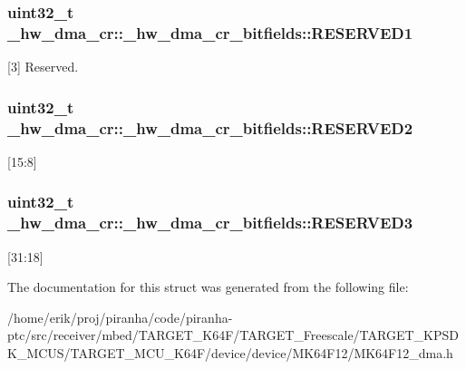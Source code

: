 \subsubsection[{\texorpdfstring{R\+E\+S\+E\+R\+V\+E\+D1}{RESERVED1}}]{\setlength{\rightskip}{0pt plus 5cm}uint32\+\_\+t \+\_\+hw\+\_\+dma\+\_\+cr\+::\+\_\+hw\+\_\+dma\+\_\+cr\+\_\+bitfields\+::\+R\+E\+S\+E\+R\+V\+E\+D1}\hypertarget{struct__hw__dma__cr_1_1__hw__dma__cr__bitfields_adcb569b382e70775391b99e2ce6bc0a5}{}\label{struct__hw__dma__cr_1_1__hw__dma__cr__bitfields_adcb569b382e70775391b99e2ce6bc0a5}
\mbox{[}3\mbox{]} Reserved. 
\subsubsection[{\texorpdfstring{R\+E\+S\+E\+R\+V\+E\+D2}{RESERVED2}}]{\setlength{\rightskip}{0pt plus 5cm}uint32\+\_\+t \+\_\+hw\+\_\+dma\+\_\+cr\+::\+\_\+hw\+\_\+dma\+\_\+cr\+\_\+bitfields\+::\+R\+E\+S\+E\+R\+V\+E\+D2}\hypertarget{struct__hw__dma__cr_1_1__hw__dma__cr__bitfields_a7f2a79d70952baeb6de255b3ad85011a}{}\label{struct__hw__dma__cr_1_1__hw__dma__cr__bitfields_a7f2a79d70952baeb6de255b3ad85011a}
\mbox{[}15\+:8\mbox{]} 
\subsubsection[{\texorpdfstring{R\+E\+S\+E\+R\+V\+E\+D3}{RESERVED3}}]{\setlength{\rightskip}{0pt plus 5cm}uint32\+\_\+t \+\_\+hw\+\_\+dma\+\_\+cr\+::\+\_\+hw\+\_\+dma\+\_\+cr\+\_\+bitfields\+::\+R\+E\+S\+E\+R\+V\+E\+D3}\hypertarget{struct__hw__dma__cr_1_1__hw__dma__cr__bitfields_a3e0dd703a5e877a26c24d5ce821a39c5}{}\label{struct__hw__dma__cr_1_1__hw__dma__cr__bitfields_a3e0dd703a5e877a26c24d5ce821a39c5}
\mbox{[}31\+:18\mbox{]} 

The documentation for this struct was generated from the following file\+:\begin{DoxyCompactItemize}
\item 
/home/erik/proj/piranha/code/piranha-\/ptc/src/receiver/mbed/\+T\+A\+R\+G\+E\+T\+\_\+\+K64\+F/\+T\+A\+R\+G\+E\+T\+\_\+\+Freescale/\+T\+A\+R\+G\+E\+T\+\_\+\+K\+P\+S\+D\+K\+\_\+\+M\+C\+U\+S/\+T\+A\+R\+G\+E\+T\+\_\+\+M\+C\+U\+\_\+\+K64\+F/device/device/\+M\+K64\+F12/M\+K64\+F12\+\_\+dma.\+h\end{DoxyCompactItemize}

